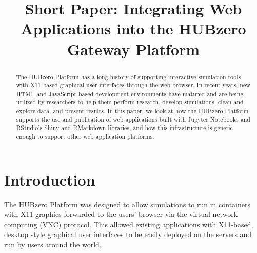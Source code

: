 \documentclass[conference]{../sty/IEEEtran}
\begin{document}
%
\title {Short Paper: Integrating Web Applications into the HUBzero Gateway Platform}


\author{
\and
{}
}


\maketitle

\begin{abstract}

The HUBzero\textsuperscript{\textregistered} Platform has a long
history of supporting interactive simulation tools with X11-based graphical
user interfaces through the web browser. In recent years, new HTML and
JavaScript based development environments have matured and are being utilized
by researchers to help them perform research, develop simulations, clean and
explore data, and present results. In this paper, we look at how the HUBzero
Platform supports the use and publication of web applications built with
Jupyter Notebooks and RStudio's Shiny and RMarkdown libraries, and how this
infrastructure is generic enough to support other web application platforms.

\end{abstract}


\section{Introduction}

The HUBzero Platform was designed to allow simulations to run in containers
with X11 graphics forwarded to the users' browser via the virtual network
computing (VNC) protocol.  This allowed existing applications with X11-based,
desktop style graphical user interfaces to be easily deployed on the servers
and run by users around the world.

\end{document}
